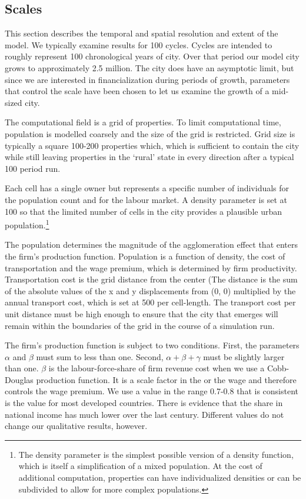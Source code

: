 \subsection{Scales}
This section describes the temporal and spatial resolution and extent of the model. 
We typically examine results for  100 cycles. Cycles are intended to roughly represent 100 chronological years of city.  Over that period our model city grows to approximately 2.5 million. The city does have an asymptotic limit, but since we are interested in financialization during periods of growth, parameters that control the scale have been chosen to let us examine the growth of a mid-sized city.  

The computational field is a grid of properties. To limit computational time, population is modelled coarsely and the size of the grid is restricted.  Grid size is typically a square 100-200 properties which, which is sufficient to contain the city while still leaving properties in the `rural' state in every direction after a typical 100 period run. 

Each cell has a single owner but represents a specific number of individuals for the population count and for the labour market. A density parameter is set at 100 so that the limited number of cells in the city provides a plausible urban population.\footnote{The density parameter is the simplest possible version of a density function, which is itself a simplification of a mixed population. At the cost of additional computation, properties can have individualized densities or can be subdivided to allow for more complex populations.}

The population determines the magnitude of the agglomeration effect that enters the firm's production function. Population is a function of density, the cost of transportation and the wage premium, which is determined by firm productivity. Transportation cost is the grid distance from the center (The distance is the sum of the absolute values of the x and y displacements from (0, 0)  multiplied by the annual transport cost, which is set at 500 per cell-length. The transport cost per unit distance must be high enough to ensure that the city that emerges will remain within the boundaries of the grid in the course of a simulation run.

The firm's production function is subject to two conditions. First, the parameters $\alpha$  and $\beta$ must sum to less than one. Second, $\alpha +\beta + \gamma $ must be slightly larger than one.  $\beta$ is the labour-force-share of  firm revenue cost when we use a Cobb-Douglas production function. It is a scale factor in the or the wage and therefore controls the wage premium. We use a value in the range  0.7-0.8 that is consistent is the value for most developed countries. There is evidence that the share in national income has much lower over the last century.  Different values do not change  our qualitative results, however.  

